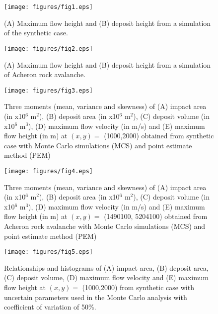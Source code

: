 \documentclass[utf8]{FrontiersinHarvard}
\begin{document}
 


\clearpage
\begin{figure}
    \centering
    \texttt{[image: figures/fig1.eps]}
    \caption{(A) Maximum flow height and (B) deposit height from a simulation of the synthetic case.}
    \label{fig:simple_dem}
\end{figure}
\clearpage

\begin{figure}
    \centering
    \texttt{[image: figures/fig2.eps]}
    \caption{(A) Maximum flow height and (B) deposit height from a simulation of Acheron rock avalanche.}
    \label{fig:acheron_dem}
\end{figure}
\clearpage

\begin{figure}
    \centering
    \texttt{[image: figures/fig3.eps]}
    \caption{Three moments (mean, variance and skewness) of (A) impact area (in x10$^6$ m$^2$), (B) deposit area (in x10$^6$ m$^2$), (C) deposit volume (in x10$^6$ m$^3$), (D) maximum flow velocity (in m/s) and (E) maximum flow height (in m) at $\left (x,y \right) =$ (1000,2000) obtained from synthetic case with Monte Carlo simulations (MCS) and point estimate method (PEM)}
    \label{fig:synth_moment_comparison}
\end{figure}

\begin{figure}
    \centering
    \texttt{[image: figures/fig4.eps]}
    \caption{Three moments (mean, variance and skewness) of (A) impact area (in x10$^6$ m$^2$), (B) deposit area (in x10$^6$ m$^2$), (C) deposit volume (in x10$^6$ m$^3$), (D) maximum flow velocity (in m/s) and (E) maximum flow height (in m) at $\left (x,y \right) =$ (1490100, 5204100) obtained from Acheron rock avalanche with Monte Carlo simulations (MCS) and point estimate method (PEM)}
    \label{fig:ac_moment_comparison}
\end{figure}

\begin{figure}
    \centering
    \texttt{[image: figures/fig5.eps]}
    \caption{Relationships and histograms of (A) impact area, (B) deposit area, (C) deposit volume, (D) maximum flow velocity and (E) maximum flow height at $\left (x,y \right) =$ (1000,2000) from synthetic case with uncertain parameters used in the Monte Carlo analysis with coefficient of variation of 50\%.}
    \label{fig:simple_mcs3}
\end{figure}
\clearpage
\end{document}
